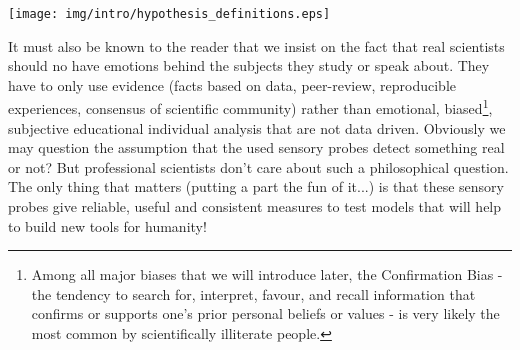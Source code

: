 	\begin{center}
	\texttt{[image: img/intro/hypothesis\_definitions.eps]}
	\end{center}
	
	It must also be known to the reader that we insist on the fact that real scientists should no have emotions behind the subjects they study or speak about. They have to only use evidence (facts based on data, peer-review, reproducible experiences, consensus of scientific community) rather than emotional, biased\footnote{Among all major biases that we will introduce later, the Confirmation Bias - the tendency to search for, interpret, favour, and recall information that confirms or supports one's prior personal beliefs or values - is very likely the most common by scientifically illiterate people.}, subjective educational individual analysis that are not data driven. Obviously we may question the assumption that the used sensory probes detect something real or not? But professional scientists don't care about such a philosophical question. The only thing that matters (putting a part the fun of it...) is that these sensory probes give reliable, useful and consistent measures to test models that will help to build new tools for humanity!

